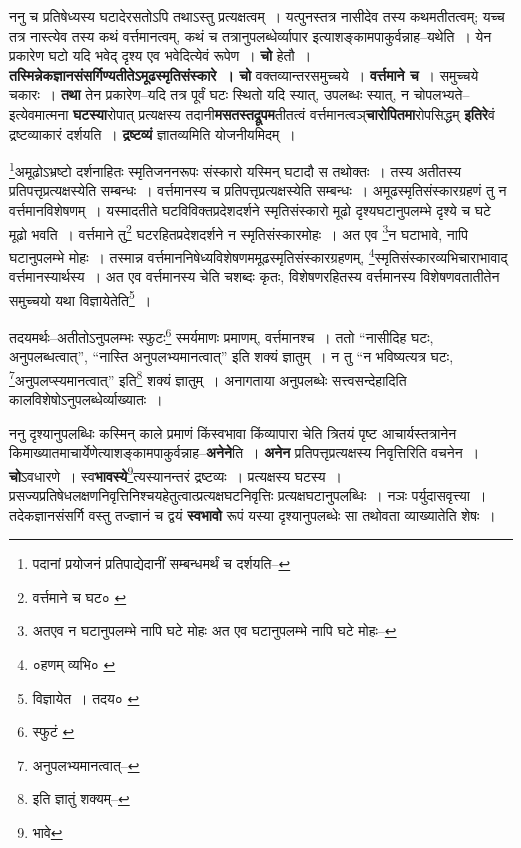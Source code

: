 \documentclass[article,12pt,a4paper]{memoir}
\begin{document}
	  \pstart ननु च प्रतिषेध्यस्य घटादेरसतोऽपि तथाऽस्तु प्रत्यक्षत्वम् । यत्पुनस्तत्र नासीदेव तस्य कथमतीतत्वम्; यच्च तत्र नास्त्येव तस्य कथं वर्त्तमानत्वम्, कथं च तत्रानुपलब्धेर्व्यापार इत्याशङ्कामपाकुर्वन्नाह--यथेति । येन प्रकारेण घटो यदि भवेद् दृश्य एव भवेदित्येवं रूपेण । \textbf{चो} हेतौ । \textbf{तस्मिन्नेकज्ञानसंसर्गिण्यतीतेऽमूढस्मृतिसंस्कारे । चो} वक्तव्यान्तरसमुच्चये । \textbf{वर्त्तमाने च} । समुच्चये चकारः । \textbf{तथा} तेन प्रकारेण--यदि तत्र पूर्वं घटः स्थितो यदि स्यात्, उपलब्धः स्यात्, न चोपलभ्यते--इत्येवमात्मना \textbf{घटस्या}रोपात् प्रत्यक्षस्य तदानी\textbf{मसतस्तद्रूपम}तीतत्वं वर्त्तमानत्वञ्\textbf{चारोपितमा}रोपसिद्धम् \textbf{इतिरे}वं द्रष्टव्याकारं दर्शयति । \textbf{द्रष्टव्यं} ज्ञातव्यमिति योजनीयमिदम् ।
	\pend
      \leavevmode{}
	  \bigskip
	  \begingroup
	

	  \pstart \footnote{पदानां प्रयोजनं प्रतिपाद्येदानीं सम्बन्धमर्थं च दर्शयति--\cite{dp-msD-n}}अमूढोऽभ्रष्टो दर्शनाहितः स्मृतिजननरूपः संस्कारो यस्मिन् घटादौ स तथोक्तः । तस्य अतीतस्य प्रतिपत्तृप्रत्यक्षस्येति सम्बन्धः । वर्त्तमानस्य च प्रतिपत्तृप्रत्यक्षस्येति सम्बन्धः । अमूढस्मृतिसंस्कारग्रहणं तु न वर्त्तमानविशेषणम् । यस्मादतीते घटविविक्तप्रदेशदर्शने स्मृतिसंस्कारो मूढो दृश्यघटानुपलम्भे दृश्ये च घटे मूढो भवति । वर्त्तमाने तु\footnote{वर्त्तमाने च घट० \cite{dp-msA} \cite{dp-msB} \cite{dp-edP} \cite{dp-edH} \cite{dp-edE} \cite{dp-edN}} घटरहितप्रदेशदर्शने न स्मृतिसंस्कारमोहः । अत एव \footnote{अतएव न घटानुपलम्भे नापि घटे मोहः \cite{dp-msA} \cite{dp-msC} \cite{dp-msD} \cite{dp-edP} \cite{dp-edH} \cite{dp-edE} \cite{dp-edN} अत एव घटानुपलम्भे नापि घटे मोहः--\cite{dp-msB}}न घटाभावे, नापि घटानुपलम्भे मोहः । तस्मान्न वर्त्तमाननिषेध्यविशेषणममूढस्मृतिसंस्कारग्रहणम्, \footnote{०हणम् व्यभि० \cite{dp-msC}}स्मृतिसंस्कारव्यभिचाराभावाद् वर्त्तमानस्यार्थस्य । अत एव वर्त्तमानस्य चेति चशब्दः कृतः, विशेषणरहितस्य वर्त्तमानस्य विशेषणवतातीतेन समुच्चयो यथा विज्ञायेतेति\footnote{विज्ञायेत । तदय० \cite{dp-msB}} ।
	\pend
       

	  \pstart तदयमर्थः--अतीतोऽनुपलम्भः स्फुटः\footnote{स्फुटं \cite{dp-msB} \cite{dp-edP} \cite{dp-edH} \cite{dp-edE} \cite{dp-edN}} स्मर्यमाणः प्रमाणम्, वर्त्तमानश्च । ततो “नासीदिह घटः, अनुपलब्धत्वात्”, “नास्ति अनुपलभ्यमानत्वात्” इति शक्यं ज्ञातुम् । न तु “न भविष्यत्यत्र घटः, \footnote{अनुपलभ्यमानत्वात्--\cite{dp-msA}}अनुपलप्स्यमानत्वात्” इति\footnote{इति ज्ञातुं शक्यम्--\cite{dp-msC}} शक्यं ज्ञातुम् । अनागताया अनुपलब्धेः सत्त्वसन्देहादिति कालविशेषोऽनुपलब्धेर्व्याख्यातः ।
	\pend
      
	  \endgroup
	

	  \pstart ननु दृश्यानुपलब्धिः कस्मिन् काले प्रमाणं किंस्वभावा किंव्यापारा चेति त्रितयं पृष्ट आचार्यस्तत्रानेन किमाख्यातमाचार्येणेत्याशङ्कामपाकुर्वन्नाह--\textbf{अनेने}ति । \textbf{अनेन} प्रतिपत्तृप्रत्यक्षस्य निवृत्तिरिति वचनेन । \textbf{चो}ऽवधारणे । स्व\textbf{भावस्ये}\footnote{भावे}त्यस्यानन्तरं द्रष्टव्यः । प्रत्यक्षस्य घटस्य । प्रसज्यप्रतिषेधलक्षणनिवृत्तिनिश्चयहेतुत्वात्प्रत्यक्षघटनिवृत्तिः प्रत्यक्षघटानुपलब्धिः । नञः पर्युदासवृत्त्या । तदेकज्ञानसंसर्गि वस्तु तज्ज्ञानं च द्वयं \textbf{स्वभावो} रूपं यस्या दृश्यानुपलब्धेः सा तथोवता व्याख्यातेति शेषः ।
	\pend
      
\end{document}
